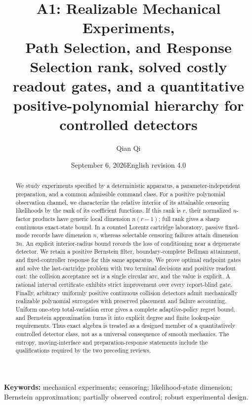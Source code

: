 \documentclass[11pt,a4paper]{article}
\title{\textbf{A1: Realizable Mechanical Experiments,\\ Path Selection, and Response}\\[.6em]
\large Selection rank, solved costly readout gates, and a quantitative\\ positive-polynomial hierarchy for controlled detectors}
\author{Qian Qi}
\date{September 6, 2026\quad English revision 4.0}
\theoremstyle{definition}\newtheorem{definition}[theorem]{Definition}
\theoremstyle{remark}\newtheorem{remark}[theorem]{Remark}
\begin{document}
\maketitle
\begin{abstract}
We study experiments specified by a deterministic apparatus, a parameter-independent preparation, and a common admissible command class. For a positive polynomial observation channel, we characterize the relative interior of its attainable censoring likelihoods by the rank of its coefficient functions. If this rank is $r$, their normalized $n$-factor products have generic local dimension $n(r-1)$; full rank gives a sharp continuous exact-state bound. In a counted Lorentz cartridge laboratory, passive fixed-mode records have dimension $n$, whereas selectable censoring failures attain dimension $3n$. An explicit interior-radius bound records the loss of conditioning near a degenerate detector. We retain a positive Bernstein filter, boundary-complete Bellman attainment, and fixed-controller response for this same apparatus. We prove optimal endpoint gates and solve the last-cartridge problem with two terminal decisions and positive readout cost: the collision acceptance set is a single circular arc, and the value is explicit. A rational interval certificate exhibits strict improvement over every report-blind gate. Finally, arbitrary uniformly positive continuous collision detectors admit mechanically realizable polynomial surrogates with preserved placement and failure accounting. Uniform one-step total-variation error gives a complete adaptive-policy regret bound, and Bernstein approximation turns it into explicit degree and finite lookup-size requirements. Thus exact algebra is treated as a designed member of a quantitatively controlled detector class, not as a universal consequence of smooth mechanics. The entropy, moving-interface and preparation-response statements include the qualifications required by the two preceding reviews.
\end{abstract}
\noindent\textbf{Keywords:} mechanical experiments; censoring; likelihood-state dimension; Bernstein approximation; partially observed control; robust experimental design.
\clearpage\tableofcontents\newpage






\appendix



\end{document}
